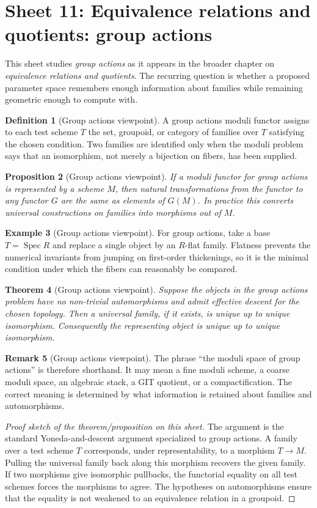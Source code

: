 \documentclass[11pt]{amsart}
\newtheorem{theorem}{Theorem}[section]
\newtheorem{proposition}[theorem]{Proposition}
\theoremstyle{definition}
\newtheorem{definition}[theorem]{Definition}
\newtheorem{example}[theorem]{Example}
\newtheorem{remark}[theorem]{Remark}
\newcommand{\Spec}{\operatorname{Spec}}
\begin{document}
\section{Sheet 11: Equivalence relations and quotients: group actions}
This sheet studies \emph{group actions} as it appears in the broader chapter on \emph{equivalence relations and quotients}.  The recurring question is whether a proposed parameter space remembers enough information about families while remaining geometric enough to compute with.
\begin{definition}[Group actions viewpoint]
A group actions moduli functor assigns to each test scheme $T$ the set, groupoid, or category of families over $T$ satisfying the chosen condition.  Two families are identified only when the moduli problem says that an isomorphism, not merely a bijection on fibers, has been supplied.
\end{definition}
\begin{proposition}[Group actions viewpoint]
If a moduli functor for group actions is represented by a scheme $M$, then natural transformations from the functor to any functor $G$ are the same as elements of $G(M)$.  In practice this converts universal constructions on families into morphisms out of $M$.
\end{proposition}
\begin{example}[Group actions viewpoint]
For group actions, take a base $T=\Spec R$ and replace a single object by an $R$-flat family.  Flatness prevents the numerical invariants from jumping on first-order thickenings, so it is the minimal condition under which the fibers can reasonably be compared.
\end{example}
\begin{theorem}[Group actions viewpoint]
Suppose the objects in the group actions problem have no non-trivial automorphisms and admit effective descent for the chosen topology.  Then a universal family, if it exists, is unique up to unique isomorphism.  Consequently the representing object is unique up to unique isomorphism.
\end{theorem}
\begin{remark}[Group actions viewpoint]
The phrase ``the moduli space of group actions'' is therefore shorthand.  It may mean a fine moduli scheme, a coarse moduli space, an algebraic stack, a GIT quotient, or a compactification.  The correct meaning is determined by what information is retained about families and automorphisms.
\end{remark}
\begin{proof}[Proof sketch of the theorem/proposition on this sheet]
The argument is the standard Yoneda-and-descent argument specialized to group actions.  A family over a test scheme $T$ corresponds, under representability, to a morphism $T\to M$.  Pulling the universal family back along this morphism recovers the given family.  If two morphisms give isomorphic pullbacks, the functorial equality on all test schemes forces the morphisms to agree.  The hypotheses on automorphisms ensure that the equality is not weakened to an equivalence relation in a groupoid.
\end{proof}
\end{document}
